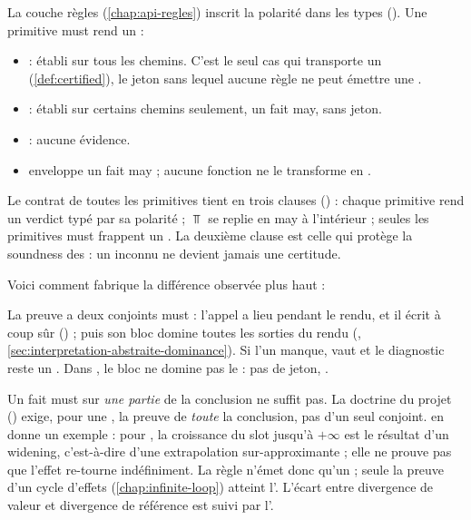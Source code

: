 La couche règles (\cref{chap:api-regles}) inscrit la polarité dans les types
(). Une primitive must rend un  :


\begin{itemize}
  \item {} : établi sur tous les chemins. C'est le seul cas qui
    transporte un  (\cref{def:certified}), le jeton sans lequel
    aucune règle ne peut émettre une \Error.
  \item {} : établi sur certains chemins seulement, un fait may, sans
    jeton.
  \item {} : aucune évidence.
  \item {} enveloppe un fait may ; aucune fonction ne le
    transforme en .
\end{itemize}

Le contrat de toutes les primitives tient en trois clauses
() : chaque primitive rend un verdict
typé par sa polarité ; $\Top$ se replie en may à l'intérieur ; seules les
primitives must frappent un . La deuxième clause est celle
qui protège la soundness des \Error : un inconnu ne devient jamais une
certitude.

Voici comment  fabrique la différence observée plus
haut :


La preuve a deux conjoints must : l'appel a lieu pendant le rendu, et il
écrit à coup sûr () ; puis son bloc domine toutes les
sorties du rendu (, \cref{sec:interpretation-abstraite-dominance}).
Si l'un manque,  vaut  et le diagnostic reste un
\Warning. Dans , le bloc  ne domine pas le
 : pas de jeton, \Warning.

\begin{piege}
  Un fait must sur \emph{une partie} de la conclusion ne suffit pas. La
  doctrine du projet () exige, pour une \Error, la preuve
  \og de \emph{toute} la conclusion, pas d'un seul conjoint\fg{}.
   en donne un exemple : pour , la
  croissance du slot jusqu'à $+\infty$ est le résultat d'un widening,
  c'est-à-dire d'une extrapolation sur-approximante ; elle ne prouve pas que
  l'effet re-tourne indéfiniment. La règle n'émet donc qu'un \Warning{} ;
  seule la preuve d'un cycle d'effets (\cref{chap:infinite-loop}) atteint
  l'\Error. L'écart entre divergence de valeur et divergence de référence est
  suivi par l'.
\end{piege}


